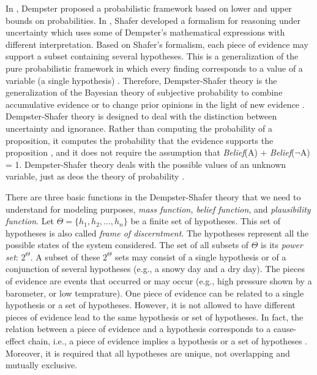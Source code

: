 \documentclass[11pt]{article}
\begin{document}
In \cite{dempster:theory}, Dempster proposed a probabilistic framework based on
lower and upper bounds on probabilities. In \cite{shafer:evidence-theory},
Shafer developed a formalism for reasoning under uncertainty which uses some of
Dempster's mathematical expressions with different interpretation. Based on
Shafer's formalism, each piece of evidence may support a subset containing
several hypotheses. This is a generalization of the pure probabilistic framework
in which every finding corresponds to a value of a variable (a single
hypothesis) \cite{diez:reasoning-uncertainty}. Therefore, Dempster-Shafer theory
is the generalization of the Bayesian theory of subjective probability to
combine accumulative evidence or to change prior opinions in the light of new
evidence \cite{das:decision-making-agents}. Dempster-Shafer theory is designed
to deal with the distinction between uncertainty and ignorance. Rather than
computing the probability of a proposition, it computes the probability that the
evidence supports the proposition \cite{russell:ai-modern}, and it does not
require the assumption that \textit{Belief}(A) + \textit{Belief}($\neg$A) = 1.
Dempster-Shafer theory deals with the possible values of an unknown variable,
just as deos the theory of probability \cite{tanimoto:ai-lisp}.

There are three basic functions in the Dempster-Shafer theory that we need to
understand for modeling purposes, \textit{mass function, belief function}, and
\textit{plausibility function}. Let $\Theta=\{h_1,h_2, \ldots, h_n\}$ be a
finite set of hypotheses. This set of hypotheses is also called \textit{frame of
discerntment}. The hypotheses represent all the possible states of the system
considered. The set of all subsets of $\Theta$ is its \textit{power set}:
$2^\Theta$. A subset of these $2^\Theta$ sets may consist of a single hypothesis
or of a conjunction of several hypotheses (e.g., a snowy day and a dry day). The
pieces of evidence are events that occurred or may occur (e.g., high pressure
shown by a barometer, or low temprature). One piece of evidence can be related
to a single hypothesis or a set of hypotheses. However, it is not allowed to
have different pieces of evidence lead to the same hypothesis or set of
hypotheses. In fact, the relation between a piece of evidence and a hypothesis
corresponds to a cause-effect chain, i.e., a piece of evidence implies a
hypothesis or a set of hypotheses \cite{kay:dst-reliability}. Moreover, it is
required that all hypotheses are unique, not overlapping and mutually exclusive.
\end{document}
